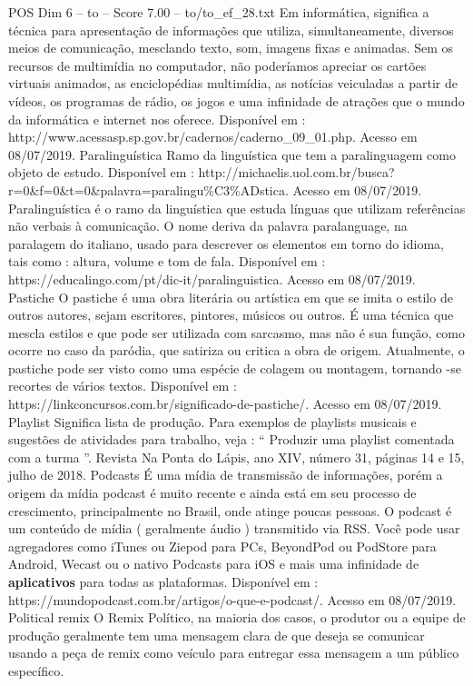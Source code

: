 \begin{textsample}{POS Dim 6 – to – Score 7.00 – to/to\_ef\_28.txt}
Em informática, significa a técnica para apresentação de informações que utiliza, simultaneamente, diversos meios de comunicação, mesclando texto, som, imagens fixas e animadas.
Sem os recursos de multimídia no computador, não poderíamos apreciar os cartões virtuais animados, as enciclopédias multimídia, as notícias veiculadas a partir de vídeos, os programas de rádio, os jogos e uma infinidade de atrações que o mundo da informática e internet nos oferece.
Disponível em : http://www.acessasp.sp.gov.br/cadernos/caderno\_09\_01.php.
Acesso em 08/07/2019.
Paralinguística Ramo da linguística que tem a paralinguagem como objeto de estudo.
Disponível em : http://michaelis.uol.com.br/busca? r=0\&f=0\&t=0\&palavra=paralingu\%C3\%ADstica.
Acesso em 08/07/2019.
Paralinguística é o ramo da linguística que estuda línguas que utilizam referências não verbais à comunicação.
O nome deriva da palavra paralanguage, na paralagem do italiano, usado para descrever os elementos em torno do idioma, tais como : altura, volume e tom de fala.
Disponível em : https://educalingo.com/pt/dic-it/paralinguistica.
Acesso em 08/07/2019.
Pastiche O pastiche é uma obra literária ou artística em que se imita o estilo de outros autores, sejam escritores, pintores, músicos ou outros.
É uma técnica que mescla estilos e que pode ser utilizada com sarcasmo, mas não é sua função, como ocorre no caso da paródia, que satiriza ou critica a obra de origem.
Atualmente, o pastiche pode ser visto como uma espécie de colagem ou montagem, tornando -se recortes de vários textos.
Disponível em : https://linkconcursos.com.br/significado-de-pastiche/.
Acesso em 08/07/2019.
Playlist Significa lista de produção.
Para exemplos de playlists musicais e sugestões de atividades para trabalho, veja : “ Produzir uma playlist comentada com a turma ”.
Revista Na Ponta do Lápis, ano XIV, número 31, páginas 14 e 15, julho de 2018.
Podcasts É uma mídia de transmissão de informações, porém a origem da mídia podcast é muito recente e ainda está em seu processo de crescimento, principalmente no Brasil, onde atinge poucas pessoas.
O podcast é um conteúdo de mídia ( geralmente áudio ) transmitido via RSS.
Você pode usar agregadores como iTunes ou Ziepod para PCs, BeyondPod ou PodStore para Android, Wecast ou o nativo Podcasts para iOS e mais uma infinidade de \textbf{aplicativos} para todas as plataformas.
Disponível em : https://mundopodcast.com.br/artigos/o-que-e-podcast/.
Acesso em 08/07/2019.
Political remix O Remix Político, na maioria dos casos, o produtor ou a equipe de produção geralmente tem uma mensagem clara de que deseja se comunicar usando a peça de remix como veículo para entregar essa mensagem a um público específico.

\end{textsample}
